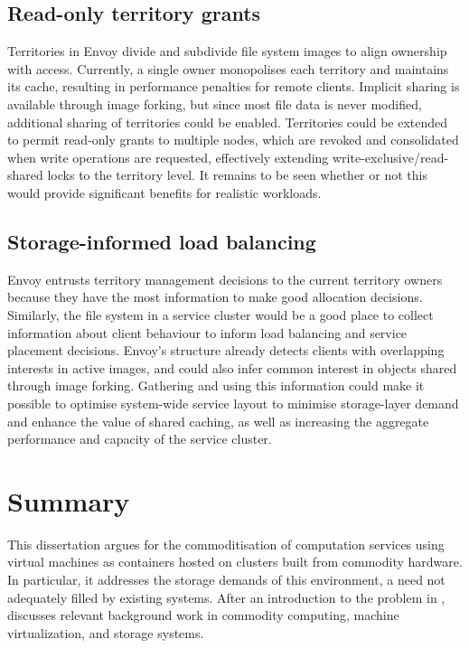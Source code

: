 \subsection{Read-only territory grants}

Territories in Envoy divide and subdivide file system images to align ownership with access. Currently, a single owner monopolises each territory and maintains its cache, resulting in performance penalties for remote clients. Implicit sharing is available through image forking, but since most file data is never modified, additional sharing of territories could be enabled. Territories could be extended to permit read-only grants to multiple nodes, which are revoked and consolidated when write operations are requested, effectively extending write-exclusive/read-shared locks to the territory level. It remains to be seen whether or not this would provide significant benefits for realistic workloads.

\subsection{Storage-informed load balancing}

Envoy entrusts territory management decisions to the current territory owners because they have the most information to make good allocation decisions. Similarly, the file system in a service cluster would be a good place to collect information about client behaviour to inform load balancing and service placement decisions. Envoy's structure already detects clients with overlapping interests in active images, and could also infer common interest in objects shared through image forking. Gathering and using this information could make it possible to optimise system-wide service layout to minimise storage-layer demand and enhance the value of shared caching, as well as increasing the aggregate performance and capacity of the service cluster.

\section{Summary}

This dissertation argues for the commoditisation of computation services using virtual machines as containers hosted on clusters built from commodity hardware. In particular, it addresses the storage demands of this environment, a need not adequately filled by existing systems. After an introduction to the problem in ,  discusses relevant background work in commodity computing, machine virtualization, and storage systems.

